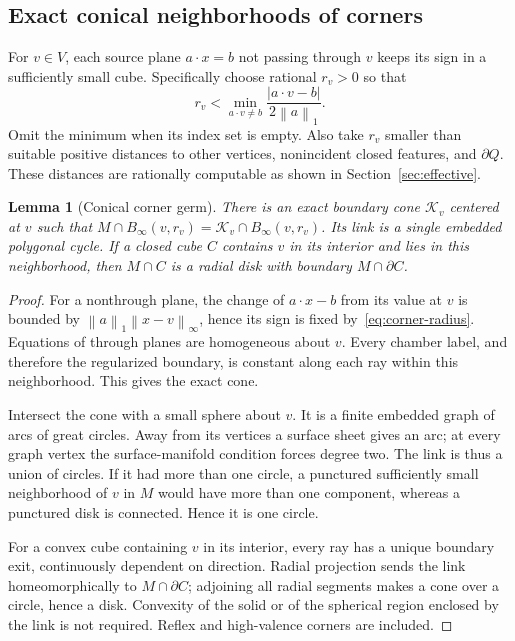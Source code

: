 \documentclass[11pt]{article}
\newtheorem{lemma}[theorem]{Lemma}
\theoremstyle{definition}
\theoremstyle{remark}
\newcommand{\norm}[1]{\left\lVert #1\right\rVert}
\newcommand{\Binf}[2]{B_\infty(#1,#2)}
\begin{document}
\subsection{Exact conical neighborhoods of corners}
\label{sec:corners}

For $v\in V$, each source plane $a\cdot x=b$ not passing through $v$
keeps its sign in a sufficiently small cube. Specifically choose
rational $r_v>0$ so that
\[
  r_v<\min_{a\cdot v\ne b}
    \frac{|a\cdot v-b|}{2\norm{a}_1}. \tag{6}\label{eq:corner-radius}
\]
Omit the minimum when its index set is empty. Also take $r_v$ smaller
than suitable positive distances to other vertices, nonincident
closed features, and $\partial Q$. These distances are rationally
computable as shown in Section~\ref{sec:effective}.

\begin{lemma}[Conical corner germ]
\label{lem:corner-cone}
There is an exact boundary cone $\mathcal K_v$ centered at $v$ such that
$M\cap\Binf{v}{r_v}=\mathcal K_v\cap\Binf{v}{r_v}$. Its link is a
single embedded polygonal cycle. If a closed cube $C$ contains $v$ in
its interior and lies in this neighborhood, then $M\cap C$ is a radial
disk with boundary $M\cap\partial C$.
\end{lemma}

\begin{proof}
For a nonthrough plane, the change of $a\cdot x-b$ from its value at
$v$ is bounded by $\norm a_1\norm{x-v}_\infty$, hence its sign is
fixed by~\eqref{eq:corner-radius}. Equations of through planes are
homogeneous about $v$. Every chamber label, and therefore the
regularized boundary, is constant along each ray within this
neighborhood. This gives the exact cone.

Intersect the cone with a small sphere about $v$. It is a finite
embedded graph of arcs of great circles. Away from its vertices a
surface sheet gives an arc; at every graph vertex the surface-manifold
condition forces degree two. The link is thus a union of circles.
If it had more than one circle, a punctured sufficiently small
neighborhood of $v$ in $M$ would have more than one component, whereas
a punctured disk is connected. Hence it is one circle.

For a convex cube containing $v$ in its interior, every ray has a
unique boundary exit, continuously dependent on direction. Radial
projection sends the link homeomorphically to $M\cap\partial C$;
adjoining all radial segments makes a cone over a circle, hence a disk.
Convexity of the solid or of the spherical region enclosed by the link
is not required. Reflex and high-valence corners are included.
\end{proof}
\end{document}
